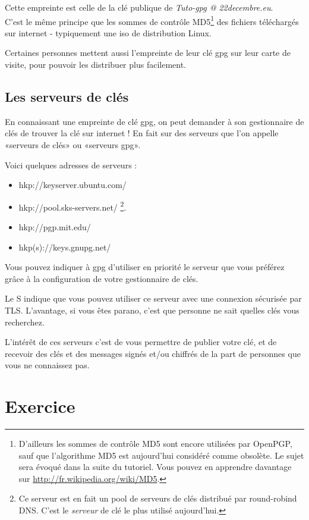 Cette empreinte est celle de la clé publique de \emph{Tuto-gpg @
22decembre.eu}.\\C'est le même principe que les sommes de contrôle MD5\footnote{D'ailleurs les sommes de contrôle MD5 sont encore utilisées par OpenPGP, sauf que l'algorithme MD5 est aujourd'hui considéré comme obsolète. Le sujet sera évoqué dans la suite du tutoriel. Vous pouvez en apprendre davantage sur \url{http://fr.wikipedia.org/wiki/MD5}.} des
fichiers téléchargés sur internet - typiquement une iso de distribution Linux.

Certaines personnes mettent aussi l'empreinte de leur clé gpg sur leur
carte de visite, pour pouvoir les distribuer plus facilement.

\subsection{Les serveurs de clés}\label{les-serveurs-de-cluxe9s}

En connaissant une empreinte de clé gpg, on peut demander à son
gestionnaire de clés de trouver la clé sur internet ! En fait sur des
serveurs que l'on appelle «serveurs de clés» ou «serveurs gpg».

Voici quelques adresses de serveurs :

\begin{itemize}
\itemsep1pt\parskip0pt
\item
  hkp://keyserver.ubuntu.com/
\item
  hkp://pool.sks-servers.net/ \footnote{Ce serveur est en fait un pool de serveurs de clés distribué par round-robind DNS. C'est le \textit{serveur} de clé le plus utilisé aujourd'hui.}.
\item
  hkp://pgp.mit.edu/
\item
  hkp(s)://keys.gnupg.net/
\end{itemize}

Vous pouvez indiquer à gpg d'utiliser en priorité le serveur que vous
préférez grâce à la configuration de votre gestionnaire de clés.

Le S indique que vous pouvez utiliser ce serveur avec une connexion
sécurisée par TLS. L'avantage, si vous êtes parano, c'est que personne
ne sait quelles clés vous recherchez.

L'intérêt de ces serveurs c'est de vous permettre de publier votre clé,
et de recevoir des clés et des messages signés et/ou chiffrés de la part
de personnes que vous ne connaissez pas.

\section{Exercice}\label{exercice}

